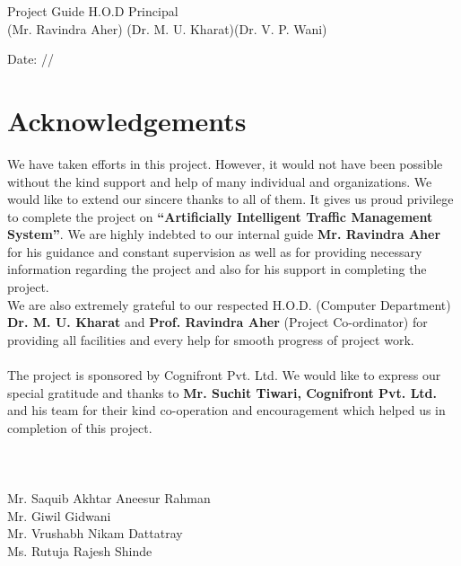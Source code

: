 \documentclass[openany,12pt]{report}
\begin{document}
\hspace{0.1in} Project Guide  \hspace{1.5in}H.O.D \hspace{0.9in} Principal  \\
\hspace{4.6in} (Mr. Ravindra Aher) \hspace{0.6in}(Dr. M. U. Kharat)\hspace{0.4in}(Dr. V. P. Wani)\\
\vspace{0.2in}

Date: \hspace{0.2 in}/\hspace{0.3 in}/   \\
\newpage {}
\chapter*{Acknowledgements}

\hspace*{0.5 in}We have taken efforts in this project. However, it would not have been possible without the kind support and help of many individual and organizations. We would like to extend our sincere thanks to all of them. It gives us proud privilege to complete the project on \textbf{ ``Artificially Intelligent Traffic Management System''}. We are highly indebted to our internal guide \textbf{Mr. Ravindra Aher} for his guidance and constant supervision as well as for providing necessary information regarding the project and also for his support in completing the project.\\
\hspace*{0.5 in}We are also extremely grateful to our respected H.O.D. (Computer Department) \textbf{Dr. M. U. Kharat}  and  \textbf{Prof. Ravindra Aher} (Project Co-ordinator) for providing all facilities and every help for smooth progress of project work.\\
\\
\hspace*{0.5 in}The project is sponsored by Cognifront Pvt. Ltd. We would like to express our special gratitude and thanks to \textbf{Mr. Suchit Tiwari, Cognifront Pvt. Ltd.} and his team for their kind co-operation and encouragement which helped us in completion of this project.\\
\\
\\
\\
\hspace*{3.5 in}Mr. Saquib Akhtar Aneesur Rahman\\
\hspace*{3.5 in}Mr. Giwil Gidwani \\
\hspace*{3.5 in}Mr. Vrushabh Nikam Dattatray\\
\hspace*{3.5 in}Ms. Rutuja Rajesh Shinde
\end{document}
